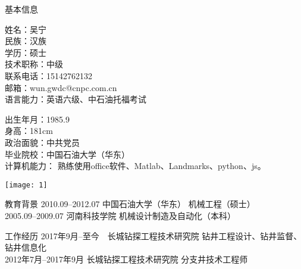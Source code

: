 \documentclass[10pt]{ctexart}
\begin{document}
\begin{mybox}[colbacktitle=MidnightBlue]{基本信息}
\begin{minipage}{0.4\linewidth}
	姓\quad \quad 名：吴宁	\\
	民\quad \quad 族：汉族\\		
	学\quad \quad 历：硕士\\
	技术职称：中级\\
	联系电话：15142762132\\
	邮\quad \quad 箱：wun.gwdc@cnpc.com.cn\\
	语言能力：英语六级、中石油托福考试
	
\end{minipage}
	\begin{minipage}{0.3\linewidth}
	出生年月：1985.9	\\
	身\quad \quad 高：181cm\\
	政治面貌：中共党员\\
	毕业院校：中国石油大学（华东）\\	
	计算机能力： 熟练使用office软件、Matlab、Landmarks、python、js。
\end{minipage}
	\begin{minipage}{0.3\linewidth}
	\begin{center}
	\quad	\texttt{[image: 1]}\\[5pt]
	\end{center}
\end{minipage}
\end{mybox}

\begin{mybox}[colbacktitle=MidnightBlue]{教育背景}
	2010.09--2012.07        \hfill            中国石油大学（华东）            \hfill         机械工程（硕士）\\
	2005.09--2009.07      \hfill         \quad\quad 河南科技学院        \hfill      机械设计制造及自动化（本科）
\end{mybox}
	
\begin{mybox}[colbacktitle=MidnightBlue]{工作经历}
2017年9月--至今			\quad\quad\	\quad\quad\quad\quad\,长城钻探工程技术研究院			\hfill 钻井工程设计、钻井监督、钻井信息化\\
2012年7月--2017年9月 	\quad\quad\quad	 长城钻探工程技术研究院   		               \hfill 分支井技术工程师
\end{mybox}
	
\end{document}
